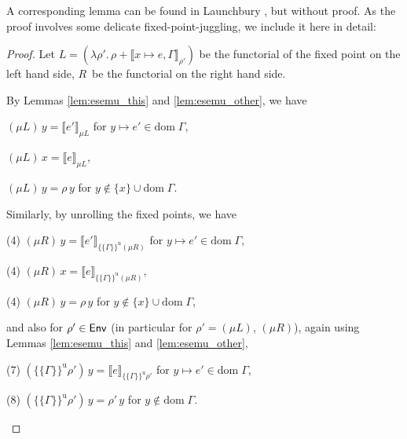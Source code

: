 \documentclass{jfp1}
\theoremstyle{nonumberbreak}
\newtheorem{proof}{Proof}
\newcommand{\sEnv}  {\text{\textsf{Env}}}
\newcommand{\dom}[1]{\text{dom}\;#1}
\newcommand{\dsem}[2]{\llbracket #1 \rrbracket_{#2}}
\newcommand{\esemu}[1]{\{\!\!\!\{#1\}\!\!\!\}^{\text{u}}}
\begin{document}
A corresponding lemma can be found in Launchbury , but without proof. As the proof involves some delicate fixed-point-juggling, we include it here in detail:

\begin{proof}
Let $L = (\lambda \rho'.\, \rho + \dsem{x\mapsto e, \Gamma}{\rho'})$ be the functorial of the fixed point on the left hand side, $R$~be the functorial on the right hand side.

By Lemmas \ref{lem:esemu_this} and \ref{lem:esemu_other}, we have
\begin{compactenum}[(1)]
\item $(\mu L)\, y = \dsem{e'}{\mu L}$ for $y\mapsto e'\in\dom\Gamma$,
\item $(\mu L)\, x = \dsem{e}{\mu L}$,
\item $(\mu L)\, y = \rho\, y$ for $y \notin \{x\}\cup\dom\Gamma$.
\end{compactenum}
Similarly, by unrolling the fixed points, we have
\begin{compactenum}[(1)]
\item[(4)] $(\mu R)\, y = \dsem{e'}{\esemu{\Gamma}{(\mu R)}}$ for $y \mapsto e'\in\dom\Gamma$,
\item[(4)] $(\mu R)\, x = \dsem{e}{\esemu{\Gamma}{(\mu R)}}$,
\item[(4)] $(\mu R)\, y = \rho\, y$ for $y \notin \{x\}\cup\dom\Gamma$,
\end{compactenum}
and also for $\rho' \in \sEnv$ (in particular for $\rho' = (\mu L)$, $(\mu R)$), again using Lemmas \ref{lem:esemu_this} and \ref{lem:esemu_other},
\begin{compactenum}[(1)]
\item[(7)] $(\esemu{\Gamma}{\rho'})\,y = \dsem{e}{\esemu{\Gamma}{\rho'}}$ for $y \mapsto e' \in \dom\Gamma$,
\item[(8)] $(\esemu{\Gamma}{\rho'})\,y = \rho'\, y$ for $y \notin \dom\Gamma$.
\end{compactenum}


\end{proof}
\end{document}
